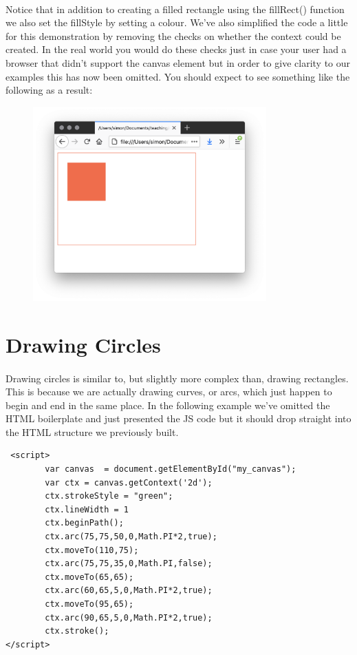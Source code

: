 \paragraph{} Notice that in addition to creating a filled rectangle using the fillRect() function we also set the fillStyle by setting a colour. We've also simplified the code a little for this demonstration by removing the checks on whether the context could be created. In the real world you would do these checks just in case your user had a browser that didn't support the canvas element but in order to give clarity to our examples this has now been omitted. You should expect to see something like the following as a result:

\begin{figure}[H]
\centering
\includegraphics[width=0.8\textwidth]{figures/canvas-red-square}
\label{fig:canvas-red-square}
\caption{}
\end{figure}


\section{Drawing Circles}
\paragraph{} Drawing circles is similar to, but slightly more complex than, drawing rectangles. This is because we are actually drawing curves, or arcs, which just happen to begin and end in the same place. In the following example we've omitted the HTML boilerplate and just presented the JS code but it should drop straight into the HTML structure we previously built.

\begin{lstlisting}
 <script>
        var canvas  = document.getElementById("my_canvas");
        var ctx = canvas.getContext('2d');
        ctx.strokeStyle = "green";
        ctx.lineWidth = 1
        ctx.beginPath();
        ctx.arc(75,75,50,0,Math.PI*2,true);  
        ctx.moveTo(110,75);
        ctx.arc(75,75,35,0,Math.PI,false);   
        ctx.moveTo(65,65);
        ctx.arc(60,65,5,0,Math.PI*2,true); 
        ctx.moveTo(95,65);
        ctx.arc(90,65,5,0,Math.PI*2,true);  
        ctx.stroke();
</script>
\end{lstlisting}

